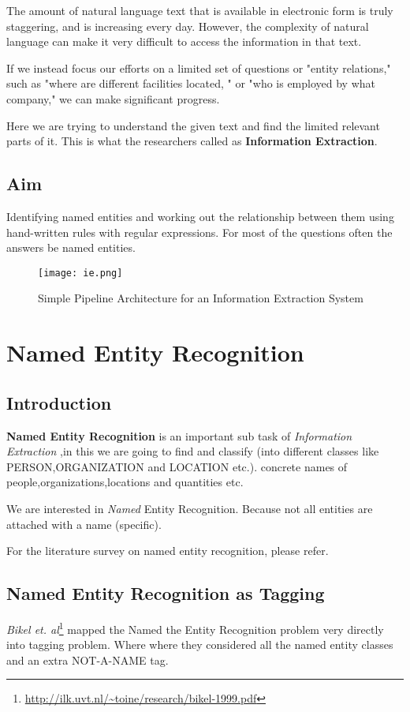\documentclass[12pt]{report}
\begin{document}
The amount of natural language text that is available in electronic 
form is truly staggering, and is increasing every day. 
However, 
the complexity of natural language can make it very difficult to access the information in that text\cite{BookIE}.\\

\par If we instead focus our efforts on a limited set of questions or 
"entity relations," such as "where are different facilities located,
" or "who is employed by what company," we can make significant progress.\cite{BookIE}

\par Here we are trying to understand the given text and find the limited relevant parts of it.
 This is what the researchers called as \textbf{Information Extraction}.
\section{Aim}
\par Identifying named entities and working out the relationship between them using hand-written
 rules with regular expressions. For most of the questions often the answers be named entities.
\begin{figure}[htp]
\centering
\texttt{[image: ie.png]}
\caption{Simple Pipeline Architecture for an Information Extraction System\cite{BookIE}}
\label{IE}
\end{figure}

\chapter{Named Entity Recognition}
\section{Introduction}
\par \textbf{Named Entity Recognition} is an important sub task of \textit{Information Extraction} 
,in this we are going to find and classify (into different classes like PERSON,ORGANIZATION and LOCATION etc.).
 concrete names of people,organizations,locations and quantities etc.
\par We are interested in \textit{Named} Entity Recognition. Because not all entities are 
attached with a name (specific).
\par For the literature survey on named entity recognition, please refer\cite{Rahul}.
\section{Named Entity Recognition as Tagging}
\par \textit{Bikel et. al}\footnote{\url{http://ilk.uvt.nl/~toine/research/bikel-1999.pdf}} mapped the  Named the Entity Recognition problem very directly into tagging problem. Where
where they considered all the named entity classes and an extra NOT-A-NAME tag. 
\end{document}
